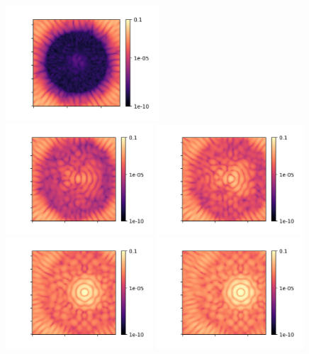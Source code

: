 \documentclass[]{spie}  %
\begin{document}
\begin{figure}[!ht]
    \centering
    \includegraphics[width=0.51\textwidth]{0PSF.png}
    \includegraphics[width=0.49\textwidth]{17PSF_1lambdaD.png}
    \includegraphics[width=0.49\textwidth]{34PSF_2lambdaD.png}
    \includegraphics[width=0.49\textwidth]{51PSF.png}
    \includegraphics[width=0.49\textwidth]{68PSF.png}

\end{figure}
\end{document}
